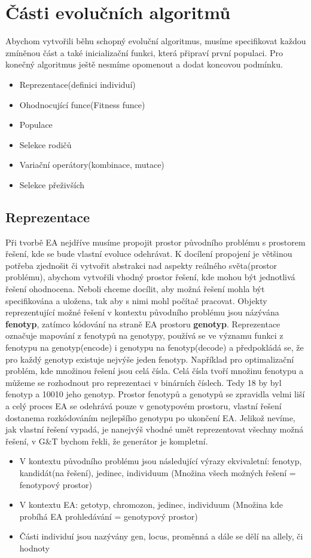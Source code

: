 \section{Části evolučních algoritmů}
Abychom vytvořili běhu schopný evoluční algoritmus, musíme specifikovat každou zmíněnou část a také inicializační funkci, která připraví první populaci. Pro konečný algoritmus ještě nesmíme opomenout a dodat koncovou podmínku. 
\begin{itemize}
\item{Reprezentace(definici individuí)}
\item{Ohodnocující funce(Fitness funce)}
\item{Populace}
\item{Selekce rodičů}
\item{Variační operátory(kombinace, mutace)}
\item{Selekce přeživších}
\end{itemize}
\subsection{Reprezentace}
Při tvorbě EA nejdříve musíme propojit prostor původního problému s prostorem řešení, kde se bude vlastní evoluce odehrávat. K docílení propojení je většinou potřeba zjednošit či vytvořit abstrakci nad aspekty reálného světa(prostor problému), abychom vytvořili vhodný prostor řešení, kde mohou být jednotlivá řešení ohodnocena. Neboli chceme docílit, aby možná řešení mohla být specifikována a uložena, tak aby s nimi mohl počítač pracovat. Objekty reprezentující možné řešení v kontextu původního problému jsou názývána \textbf{fenotyp}, zatímco kódování na straně EA prostoru \textbf{genotyp}. Reprezentace označuje mapování z fenotypů na genotypy, používá se ve významu funkci z fenotypu na genotyp(encode) i genotypu na fenotyp(decode) a předpokládá se, že pro každý genotyp existuje nejvýše jeden fenotyp. Například pro optimalizační problém, kde množinou řešení jsou celá čísla. Celá čísla tvoří množinu fenotypu a můžeme se rozhodnout pro reprezentaci v binárních číslech. Tedy 18 by byl fenotyp a 10010 jeho genotyp. Prostor fenotypů a genotypů se zpravidla velmi liší a celý proces EA se odehrává pouze v genotypovém prostoru, vlastní řešení dostanema rozkódováním nejlepšího genotypu po ukončení EA. Jelikož nevíme, jak vlastní řešení vypadá, je nanejvýš vhodné umět reprezentovat všechny možná řešení, v G\&T bychom řekli, že generátor je kompletní.
\begin{itemize}
\item V kontextu původního problému jsou následující výrazy ekvivaletní: fenotyp, kandidát(na řešení), jedinec, individuum (Množina všech možných řešení = fenotypový prostor)
\item V kontextu EA: getotyp, chromozon, jedinec, individuum (Množina kde probíhá EA prohledávání = genotypový prostor)
\item Části individuí jsou nazývány gen, locus, proměnná a dále se dělí na allely, či hodnoty
\end{itemize}

